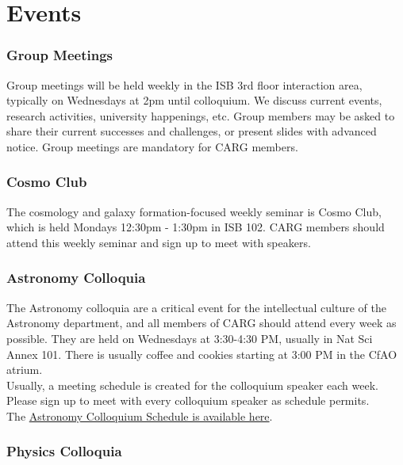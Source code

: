\section{Events}
\label{sec:events}

\subsubsection{Group Meetings}
\label{sec:group_meetings}
Group meetings will be held
weekly
in the ISB 3rd floor interaction
area, typically on Wednesdays
at 2pm until colloquium.
We discuss current events,
research activities, university
happenings, etc. Group members
may be asked to share their
current successes and challenges,
or present slides with advanced
notice.
Group meetings are mandatory
for CARG members.

\subsubsection{Cosmo Club}
\label{sec:cosmo_club}

The cosmology and galaxy
formation-focused weekly
seminar is Cosmo Club, 
which is held
Mondays 12:30pm - 1:30pm in
ISB 102. CARG members should
attend this weekly seminar
and sign up 
to meet with speakers.

\subsubsection{Astronomy Colloquia}
\label{sec:astro_colloquia}

The Astronomy colloquia are a
critical event for the
intellectual culture of the
Astronomy department, and all
members of CARG should attend
every week as possible.
They are held on Wednesdays
at 3:30-4:30 PM, usually in
Nat Sci Annex 101.
There is usually
coffee and cookies starting
at 3:00 PM in the CfAO atrium.\\

\noindent
Usually, a meeting schedule is 
created for the colloquium speaker each
week. Please sign up to meet
with every colloquium speaker as
schedule permits.\\

\noindent
The
\href{https://www.astro.ucsc.edu/news-events/Seminars/index.html}{Astronomy Colloquium Schedule is available here}.

\subsubsection{Physics Colloquia}
\label{sec:phys_colloquia}

